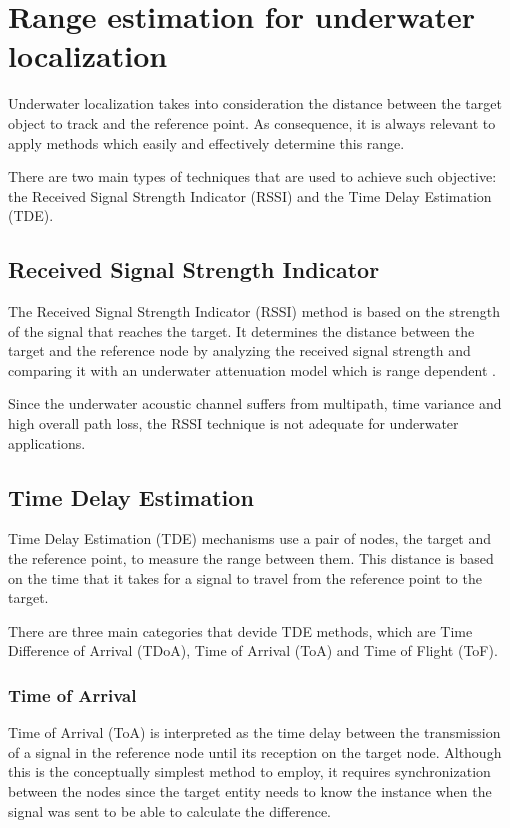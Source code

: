 
\section{Range estimation for underwater localization}

Underwater localization takes into consideration the distance between the target object to track and the reference point. As consequence, it is always relevant to apply methods which easily and effectively determine this range.

There are two main types of techniques that are used to achieve such objective: the Received Signal Strength Indicator (RSSI) and the Time Delay Estimation (TDE).


\subsection{Received Signal Strength Indicator}

The Received Signal Strength Indicator (RSSI) method is based on the strength of the signal that reaches the target. It determines the distance between the target and the reference node by analyzing the received signal strength and comparing it with an underwater attenuation model which is range dependent \cite{ocean-acoust}. 

Since the underwater acoustic channel suffers from multipath, time variance and high overall path loss, the RSSI technique is not adequate for underwater applications.

\subsection{Time Delay Estimation}
Time Delay Estimation (TDE) mechanisms use a pair of nodes, the target and the reference point, to measure the range between them. This distance is based on the time that it takes for a signal to travel from the reference point to the target.

There are three main categories that devide TDE methods, which are Time Difference of Arrival (TDoA), Time of Arrival (ToA) and Time of Flight (ToF).

\subsubsection{Time of Arrival}

Time of Arrival (ToA) is interpreted as the time delay between the transmission of a signal in the reference node until its reception on the target node. Although this is the conceptually simplest method to employ, it requires synchronization between the nodes since the target entity needs to know the instance when the signal was sent to be able to calculate the difference.

